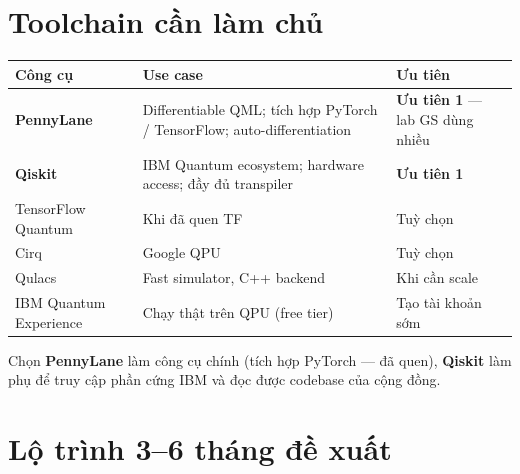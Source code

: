 \documentclass[11pt,a4paper]{article}
\begin{document}
\section{Toolchain cần làm chủ}

\begin{longtable}{@{}p{3.2cm} p{7.2cm} p{4.6cm}@{}}
\toprule
\textbf{Công cụ} & \textbf{Use case} & \textbf{Ưu tiên} \\
\midrule
\endhead
\textbf{PennyLane} & Differentiable QML; tích hợp PyTorch / TensorFlow; auto-differentiation & \textbf{Ưu tiên 1} --- lab GS dùng nhiều \\
\textbf{Qiskit} & IBM Quantum ecosystem; hardware access; đầy đủ transpiler & \textbf{Ưu tiên 1} \\
TensorFlow Quantum & Khi đã quen TF & Tuỳ chọn \\
Cirq & Google QPU & Tuỳ chọn \\
Qulacs & Fast simulator, C++ backend & Khi cần scale \\
IBM Quantum Experience & Chạy thật trên QPU (free tier) & Tạo tài khoản sớm \\
\bottomrule
\end{longtable}

\begin{note}[Đề xuất]
Chọn \textbf{PennyLane} làm công cụ chính (tích hợp PyTorch --- đã quen), \textbf{Qiskit} làm phụ để truy cập phần cứng IBM và đọc được codebase của cộng đồng.
\end{note}

\section{Lộ trình 3--6 tháng đề xuất}
\end{document}

